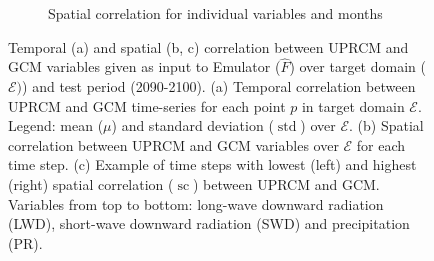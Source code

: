 \documentclass[a4paper,11pt,oneside]{report}
\begin{document}
\begin{figure}[tbp]
\begin{subfigure}[b]{\columnwidth}
            \caption[]%
            {{\small Spatial correlation for individual variables and months}} \label{fig:spatial-corr-GCM-RCM-ex}
        \end{subfigure}
        \hfill
        \caption[]
        {\small Temporal (a) and spatial (b, c) correlation between UPRCM and GCM variables given as input to Emulator ($\hat{F}$) over target domain ($\mathcal{E})$) and test period (2090-2100). (a) Temporal correlation between UPRCM and GCM time-series for each point $p$ in target domain $\mathcal{E}$. Legend: mean ($\mu$) and standard deviation ($\operatorname{std}$) over $\mathcal{E}$. (b) Spatial correlation between UPRCM and GCM variables over $\mathcal{E}$ for each time step. (c) Example of time steps with lowest (left) and highest (right) spatial correlation ($\operatorname{sc}$) between UPRCM and GCM. Variables from top to bottom: long-wave downward radiation (LWD), short-wave downward radiation (SWD) and precipitation (PR).} 
        \label{fig:corr-GCM-RCM}
    \end{figure}

\end{document}
